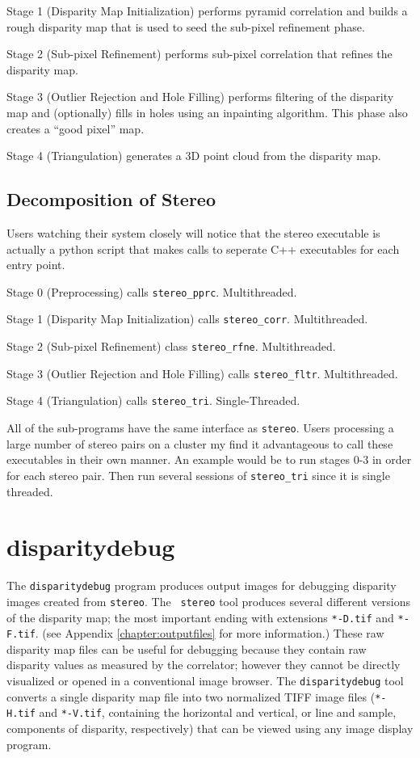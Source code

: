 Stage 1 (Disparity Map Initialization) performs pyramid correlation and builds a rough disparity map that is used to seed the sub-pixel refinement phase.

Stage 2 (Sub-pixel Refinement) performs sub-pixel correlation that
refines the disparity map.

Stage 3 (Outlier Rejection and Hole Filling) performs filtering of the
disparity map and (optionally) fills in holes using an inpainting
algorithm.  This phase also creates a ``good pixel'' map.

Stage 4 (Triangulation) generates a 3D point cloud from the disparity
map.

\subsection{Decomposition of Stereo}

Users watching their system closely will notice that the stereo
executable is actually a python script that makes calls to seperate
C++ executables for each entry point.

Stage 0 (Preprocessing) calls \texttt{stereo\_pprc}. Multithreaded.

Stage 1 (Disparity Map Initialization) calls
\texttt{stereo\_corr}. Multithreaded.

Stage 2 (Sub-pixel Refinement) class \texttt{stereo\_rfne}. Multithreaded.

Stage 3 (Outlier Rejection and Hole Filling) calls
\texttt{stereo\_fltr}. Multithreaded.

Stage 4 (Triangulation) calls \texttt{stereo\_tri}. Single-Threaded.

All of the sub-programs have the same interface as
\texttt{stereo}. Users processing a large number of stereo pairs on a
cluster my find it advantageous to call these executables in their own
manner. An example would be to run stages 0-3 in order for each stereo
pair. Then run several sessions of \texttt{stereo\_tri} since it is
single threaded.

\section{disparitydebug}
\label{disparitydebug}

The \texttt{disparitydebug} program produces output images for
debugging disparity images created from \verb#stereo#. The {\tt
stereo} tool produces several different versions of the disparity
map; the most important ending with extensions \verb#*-D.tif# and
\verb#*-F.tif#. (see Appendix \ref{chapter:outputfiles} for more
information.)  These raw disparity map files can be useful for
debugging because they contain raw disparity values as measured by
the correlator; however they cannot be directly visualized or opened
in a conventional image browser.  The \verb#disparitydebug# tool
converts a single disparity map file into two normalized TIFF image
files (\verb#*-H.tif# and \verb#*-V.tif#, containing the horizontal
and vertical, or line and sample, components of disparity, respectively)
that can be viewed using any image display program.

